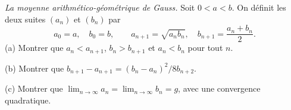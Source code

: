\emph{La moyenne arithmético-géométrique de Gauss.} Soit $0 < a < b$. On définit les deux suites $(a_n)$ et $(b_n)$ par
\[ a_0 = a,\quad b_0 = b,\qquad a_{n+1} = \sqrt{a_n b_n},\quad b_{n+1} = \frac{a_n + b_n}{2}. \]
(a) Montrer que $a_n < a_{n+1}$, $b_n > b_{n+1}$ et $a_n < b_n$ pour tout $n$.

(b) Montrer que $b_{n+1} - a_{n+1} = (b_n - a_n)^2/8b_{n+2}$.

(c) Montrer que $\lim_{n\to\infty} a_n = \lim_{n\to\infty} b_n = g$, avec une convergence quadratique.
